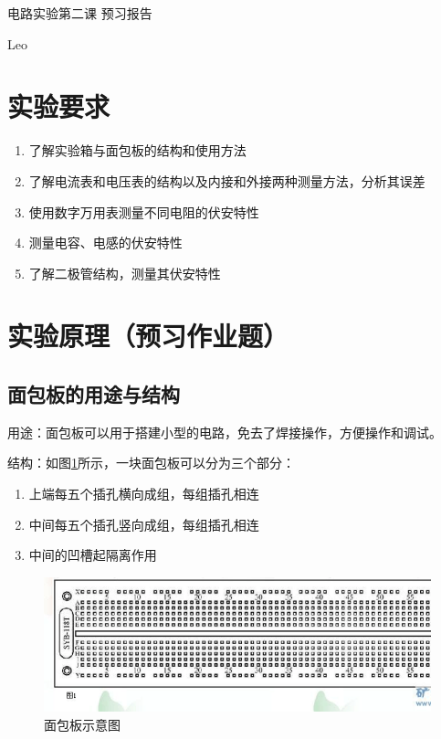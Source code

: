 \documentclass{ctexart}
\begin{document}
\begin{center}
    \LARGE{电路实验第二课 预习报告}
\end{center}
\begin{center}
    Leo
\end{center}
\section{实验要求}
\begin{enumerate}
    \item 了解实验箱与面包板的结构和使用方法
    \item 了解电流表和电压表的结构以及内接和外接两种测量方法，分析其误差
    \item 使用数字万用表测量不同电阻的伏安特性
    \item 测量电容、电感的伏安特性
    \item 了解二极管结构，测量其伏安特性
\end{enumerate}
\section{实验原理（预习作业题）}
\subsection{面包板的用途与结构}
用途：面包板可以用于搭建小型的电路，免去了焊接操作，方便操作和调试。

结构：如图\ref{面包板示意图}所示，一块面包板可以分为三个部分：
\begin{enumerate}
    \item 上端每五个插孔横向成组，每组插孔相连
    \item 中间每五个插孔竖向成组，每组插孔相连
    \item 中间的凹槽起隔离作用
\end{enumerate}
\begin{figure}[ht]\label{面包板示意图}

    \includegraphics[scale=0.4]{./pictures/breadboard.jpeg}
    \caption{面包板示意图}
    
\end{figure}
\end{document}
